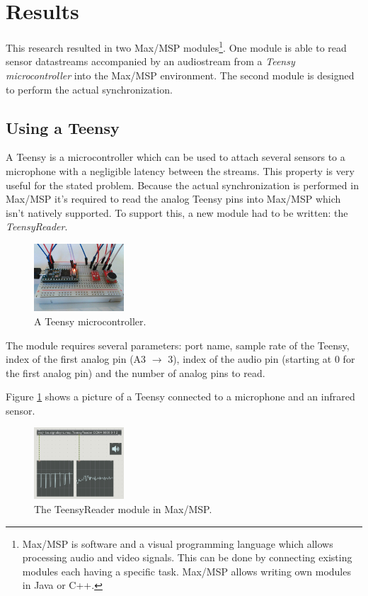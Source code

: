\documentclass[twocolumn]{phdsymp} %
\begin{document}
\section{Results}
This research resulted in two Max/MSP modules\footnote{Max/MSP is software and a visual programming language which allows processing audio and video signals. This can be done by connecting existing modules each having a specific task. Max/MSP allows writing own modules in Java or C++.}. One module is able to read sensor datastreams accompanied by an audiostream from a \emph{Teensy microcontroller} into the Max/MSP environment. The second module is designed to perform the actual synchronization.

\subsection{Using a Teensy}

A Teensy is a microcontroller which can be used to attach several sensors to a microphone with a negligible latency between the streams. This property is very useful for the stated problem. Because the actual synchronization is performed in Max/MSP it's required to read the analog Teensy pins into Max/MSP which isn't natively supported. To support this, a new module had to be written: the \mbox{\emph{TeensyReader}}.
\begin{figure}[ht]
	\begin{center}
		\includegraphics[width=0.3\textwidth]{../boek/figuren/teensy.jpg}
		\caption{\label{teensy}A Teensy microcontroller.}
	\end{center}
\end{figure}
The module requires several parameters: port name, sample rate of the Teensy, index of the first analog pin (A3 $\rightarrow$ 3), index of the audio pin (starting at 0 for the first analog pin) and the number of analog pins to read.

Figure \ref{teensy} shows a picture of a Teensy connected to a microphone and an infrared sensor.

\begin{figure}[ht]
	\begin{center}
		\includegraphics[width=0.3\textwidth]{../boek/figuren/teensyreader.png}
		\caption{\label{teensyreader}The TeensyReader module in Max/MSP.}
	\end{center}
\end{figure}
\end{document}
